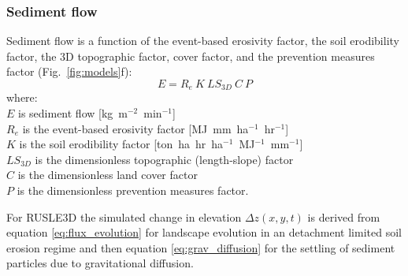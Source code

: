 \documentclass[gmd, manuscript]{copernicus}
\begin{document}

\subsubsection{Sediment flow}

Sediment flow is a function of the event-based erosivity factor, 
the soil erodibility factor, the 3D topographic factor, cover factor, and the prevention measures factor 
(Fig.~\ref{fig:models}f):
%
\begin{equation}
\label{eq:rusle}
{E = R_e ~ K ~ LS_{3D} ~ C ~ P}
\end{equation}
%
{\small
\noindent
where: \\
\noindent
\hspace*{0.5em} $E$ is sediment flow [\unit{kg~m}$^{-2}$~\unit{min}$^{-1}$]\\
\hspace*{0.5em} $R_e$ is the event-based erosivity factor [\unit{MJ~mm~ha}$^{-1}$~\unit{hr}$^{-1}$]\\ %
\hspace*{0.5em} $K$ is the soil erodibility factor [\unit{ton~ha~hr~ha}$^{-1}$~\unit{MJ}$^{-1}$~\unit{mm}$^{-1}$]\\
\hspace*{0.5em} $LS_{3D}$ is the dimensionless topographic (length-slope) factor\\
\hspace*{0.5em} $C$ is the dimensionless land cover factor\\
\hspace*{0.5em} $P$ is the dimensionless prevention measures factor.\\
}

\noindent
For RUSLE3D the simulated change in elevation $\Delta z(x,y,t)$
is derived from 
equation \ref{eq:flux_evolution}
for landscape evolution in an detachment limited soil erosion regime
and then equation \ref{eq:grav_diffusion}
for the settling of sediment particles due to gravitational diffusion.

\end{document}

